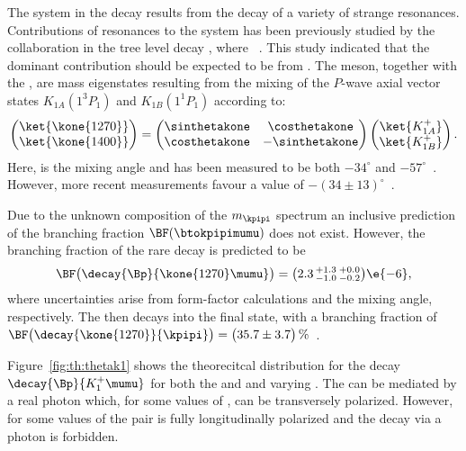 The \kpipi system in the decay \btokpipimumu results from the decay of a variety of strange
resonances.
Contributions of resonances to the \kpipi system has been previously studied by the \belle
collaboration in the tree level decay \btojpsikpipi, where \jpsitomumu~\cite{Guler:2010if}.
This study indicated that the dominant contribution should be expected
to be from .
The  meson, together with the , are mass eigenstates resulting from the
mixing of the $P$-wave axial vector states $K_{1A}(1^3P_1)$ and $K_{1B}(1^1P_1)$ according to:
\begin{equation}
  \begin{pmatrix}
    \ket{\kone{1270}} \\
    \ket{\kone{1400}}
  \end{pmatrix}
  =
  \begin{pmatrix}
    \sinthetakone & \costhetakone \\
    \costhetakone & -\sinthetakone
  \end{pmatrix}
  \begin{pmatrix}
    \ket{K_{1A}^+} \\
    \ket{K_{1B}^+}
  \end{pmatrix}.
  \label{eq:k1mixing}
\end{equation}
Here, \thetakone is the mixing angle and has been measured to be both $-34^\circ$ and
$-57^\circ$~\cite{PhysRevD.47.1252,Tayduganov:2011ui,Hatanaka:2008xj,Cheng:2011pb,Divotgey:2013jba,Cheng:2013cwa}.
However, more recent measurements favour a value of
$-(34\pm13)^\circ$~\cite{Hatanaka:2008xj,Cheng:2011pb,Divotgey:2013jba,Cheng:2013cwa}.

Due to the unknown composition of the $m_\kpipi$ spectrum an inclusive prediction of the branching
fraction $\BF(\btokpipimumu)$ does not exist.
However, the branching fraction of the rare decay  is predicted to
be~\cite{Hatanaka:2008gu}
\begin{equation}
  \BF\big(\decay{\Bp}{\kone{1270}\mumu}\big) = \big(2.3\,^{+1.3}_{-1.0}\,^{+0.0}_{-0.2}\big)\e{-6},
\end{equation}
where uncertainties arise from form-factor calculations and the mixing angle, respectively.
The  then decays into the \kpipi final state, with a branching fraction of
$\BF\big(\decay{\kone{1270}}{\kpipi}\big)=\big(35.7\pm3.7\big)\,\%$~\cite{PDG2012}.

Figure~\ref{fig:th:thetak1} shows the theorecitcal \qsq distribution for the decay
$\decay{\Bp}{K_1^+\mumu}$ for both the  and  and varying \thetakone.
The  can be mediated by a real photon which, for some values of \thetakone, can be
transversely polarized.
However, for some values of \thetakone the \mumu pair is fully longitudinally polarized and the
decay via a photon is forbidden.

